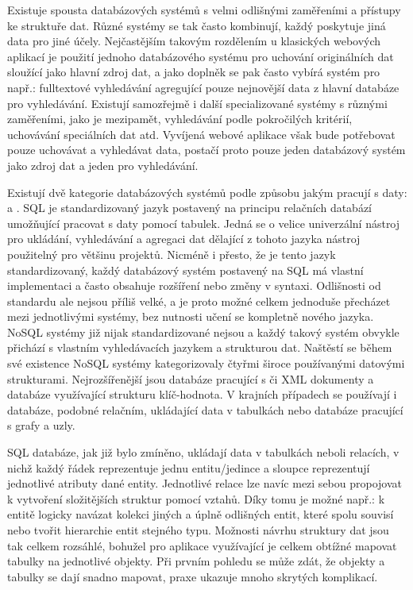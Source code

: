 	Existuje spousta databázových systémů s velmi odlišnými zaměřeními a přístupy ke struktuře dat.
	Různé systémy se tak často kombinují, každý poskytuje jiná data pro jiné účely.
	Nejčastějším takovým rozdělením u klasických webových aplikací je použití jednoho databázového systému pro
	uchování originálních dat sloužící jako hlavní zdroj dat, a jako doplněk se pak často vybírá
	systém pro např.: fulltextové vyhledávání agregující pouze nejnovější data z hlavní databáze pro vyhledávání.
	Existují samozřejmě i další specializované systémy s různými zaměřeními, jako je mezipamět, vyhledávání podle pokročilých kritérií,
	uchovávání speciálních dat atd.
	Vyvíjená webové aplikace však bude potřebovat pouze uchovávat a vyhledávat data, postačí proto pouze jeden databázový systém
	jako zdroj dat a jeden pro vyhledávání.

	Existují dvě kategorie databázových systémů podle způsobu jakým pracují s daty:  a .
	\Ac{SQL} je standardizovaný jazyk postavený na principu relačních databází umožňující pracovat s daty pomocí tabulek.
	Jedná se o velice univerzální nástroj pro ukládání, vyhledávání a agregaci dat dělající z tohoto jazyka
	nástroj použitelný pro většinu projektů.
	Nicméně i přesto, že je tento jazyk standardizovaný, každý databázový systém postavený na \Ac{SQL}
	má vlastní implementaci a často obsahuje rozšíření nebo změny v syntaxi. \cite{sql_intro}
	Odlišnosti od standardu ale nejsou příliš velké, a je proto možné celkem jednoduše přecházet mezi jednotlivými
	systémy, bez nutnosti učení se kompletně nového jazyka.
	\Ac{NoSQL} systémy již nijak standardizované nejsou a každý takový systém obvykle přichází s vlastním
	vyhledávacích jazykem a strukturou dat.
	Naštěstí se během své existence \Ac{NoSQL} systémy kategorizovaly čtyřmi široce používanými
	datovými strukturami.
	Nejrozšířenější jsou databáze pracující s  či \Ac{XML} dokumenty a databáze využívající strukturu klíč-hodnota.
	V krajních případech se používají i databáze, podobné relačním, ukládající data v tabulkách nebo databáze pracující
	s grafy a uzly. \cite{nosql_explained}

	\Ac{SQL} databáze, jak již bylo zmíněno, ukládají data v tabulkách neboli relacích, v nichž každý řádek reprezentuje
	jednu entitu/jedince a sloupce reprezentují jednotlivé atributy dané entity.
	Jednotlivé relace lze navíc mezi sebou propojovat k vytvoření složitějších struktur pomocí vztahů.
	Díky tomu je možné např.: k entitě logicky navázat kolekci jiných a úplně odlišných entit, které spolu souvisí
	nebo tvořit hierarchie entit stejného typu.
	Možnosti návrhu struktury dat jsou tak celkem rozsáhlé, bohužel pro aplikace využívající 
	je celkem obtížné mapovat tabulky na jednotlivé objekty.
	Při prvním pohledu se může zdát, že objekty a tabulky se dají snadno mapovat, praxe ukazuje mnoho skrytých komplikací.

